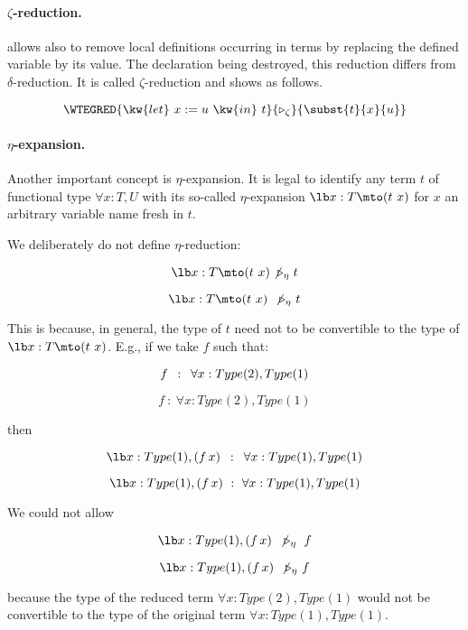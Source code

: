 \paragraph[$\zeta$-reduction.]{$\zeta$-reduction.\label{zeta}}

{\Coq} allows also to remove local definitions occurring in terms by
replacing the defined variable by its value. The declaration being
destroyed, this reduction differs from $\delta$-reduction. It is
called $\zeta$-reduction and shows as follows.

$$\WTEGRED{\kw{let}~x:=u~\kw{in}~t}{\triangleright_{\zeta}}{\subst{t}{x}{u}}$$

\paragraph{$\eta$-expansion.%
\label{eta}%
%
}%
Another important concept is $\eta$-expansion. It is legal to identify any
term $t$ of functional type $\forall x:T, U$ with its so-called
$\eta$-expansion $\lb x:T\mto (t\ x)$ for $x$ an arbitrary variable
name fresh in $t$.

\Rem We deliberately do not define $\eta$-reduction:
\begin{latexonly}
  $$\lb x:T\mto (t\ x)\not\triangleright_\eta\hskip.3em t$$
\end{latexonly}
\begin{htmlonly}
  $$\lb x:T\mto (t\ x)~\not\triangleright_\eta~t$$
\end{htmlonly}
This is because, in general, the type of $t$ need not to be convertible to the type of $\lb x:T\mto (t\ x)$.
E.g., if we take $f$ such that:
\begin{latexonly}
  $$f\hskip.5em:\hskip.5em\forall x:Type(2),Type(1)$$
\end{latexonly}
\begin{htmlonly}
  $$f~:~\forall x:Type(2),Type(1)$$
\end{htmlonly}
then
\begin{latexonly}
  $$\lb x:Type(1),(f\, x)\hskip.5em:\hskip.5em\forall x:Type(1),Type(1)$$
\end{latexonly}
\begin{htmlonly}
  $$\lb x:Type(1),(f\, x)~:~\forall x:Type(1),Type(1)$$
\end{htmlonly}
We could not allow
\begin{latexonly}
  $$\lb x:Type(1),(f\,x)\hskip.4em\not\triangleright_\eta\hskip.6em f$$
\end{latexonly}
\begin{htmlonly}
  $$\lb x:Type(1),(f\,x)~\not\triangleright_\eta~f$$
\end{htmlonly}
because the type of the reduced term $\forall x:Type(2),Type(1)$
would not be convertible to the type of the original term $\forall x:Type(1),Type(1)$.

